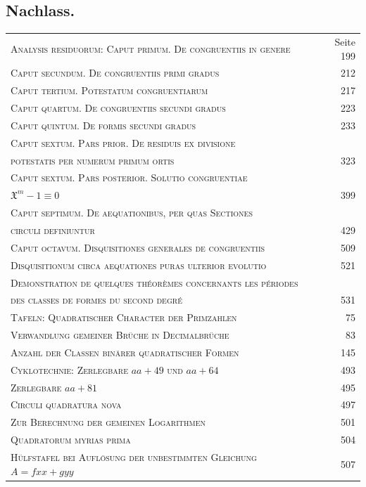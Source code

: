\documentclass[10pt,a4paper]{article}
\begin{document}
\medskip

\subsection*{Nachlass.}

\begin{tabular}{p{8cm} r}
\textsc{Analysis residuorum: Caput primum. De congruentiis in genere} & Seite 199 \\
\textsc{Caput secundum. De congruentiis primi gradus} & 212 \\
\textsc{Caput tertium. Potestatum congruentiarum} & 217 \\
\textsc{Caput quartum. De congruentiis secundi gradus} & 223 \\
\textsc{Caput quintum. De formis secundi gradus} & 233 \\
\textsc{Caput sextum. Pars prior. De residuis ex divisione} & \\
\quad \textsc{potestatis per numerum primum ortis} & 323 \\
\textsc{Caput sextum. Pars posterior. Solutio congruentiae} & \\
\quad $\mathfrak{X}^m - 1 \equiv 0$ & 399 \\
\textsc{Caput septimum. De aequationibus, per quas Sectiones} & \\
\quad \textsc{circuli definiuntur} & 429 \\
\textsc{Caput octavum. Disquisitiones generales de congruentiis} & 509 \\
\textsc{Disquisitionum circa aequationes puras ulterior evolutio} & 521 \\
\textsc{Demonstration de quelques th\'eor\`emes concernants les p\'eriodes} & \\
\quad \textsc{des classes de formes du second degr\'e} & 531 \\
\textsc{Tafeln: Quadratischer Character der Primzahlen} & 75 \\
\textsc{Verwandlung gemeiner Br\"uche in Decimalbr\"uche} & 83 \\
\textsc{Anzahl der Classen bin\"arer quadratischer Formen} & 145 \\
\textsc{Cyklotechnie: Zerlegbare $aa+49$ und $aa+64$} & 493 \\
\textsc{Zerlegbare $aa+81$} & 495 \\
\textsc{Circuli quadratura nova} & 497 \\
\textsc{Zur Berechnung der gemeinen Logarithmen} & 501 \\
\textsc{Quadratorum myrias prima} & 504 \\
\textsc{H\"ulfstafel bei Aufl\"osung der unbestimmten Gleichung $A = fxx + gyy$} & 507 \\
\end{tabular}
\end{document}
